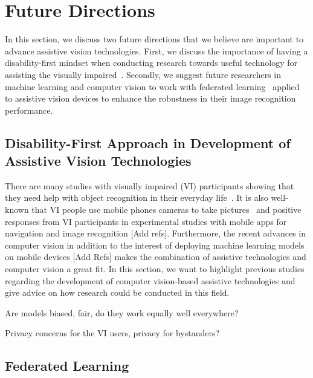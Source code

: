 \section{Future Directions}\label{chap5:sec:future_directions}

In this section, we discuss two future directions that we believe are important to advance assistive vision technologies. First, we discuss the importance of having a disability-first mindset when conducting research towards useful technology for assisting the visually impaired~\cite{theodorou2021disability}. Secondly, we suggest future researchers in machine learning and computer vision to work with federated learning~\cite{li2020federated} applied to assistive vision devices to enhance the robustness in their image recognition performance. 



\subsection{Disability-First Approach in Development of Assistive Vision Technologies}

There are many studies with visually impaired (VI) participants showing that they need help with object recognition in their everyday life~\cite{jayant2011supporting, gurari2018vizwiz}. It is also well-known that VI people use mobile phones cameras to take pictures~\cite{jayant2011supporting} and positive responses from VI participants in experimental studies with mobile apps for navigation and image recognition [Add refs]. Furthermore, the recent advances in computer vision in addition to the interest of deploying machine learning models on mobile devices [Add Refs] makes the combination of assistive technologies and computer vision a great fit. In this section, we want to highlight previous studies regarding the development of computer vision-based assistive technologies and give advice on how research could be conducted in this field. 



Are models biased, fair, do they work equally well everywhere?

Privacy concerns for the VI users, privacy for bystanders?


\subsection{Federated Learning}




